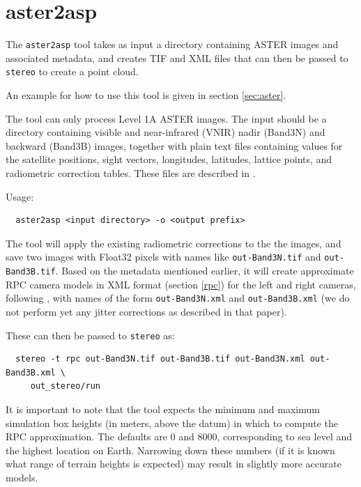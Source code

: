 \section{aster2asp}
\label{app:aster}

The \texttt{aster2asp} tool takes as input a directory containing ASTER images and associated 
metadata, and creates TIF and XML files that can then be passed to \texttt{stereo} to create
a point cloud. 

An example for how to use this tool is given in section \ref{sec:aster}.

The tool can only process Level 1A ASTER images. The input should be a
directory containing visible and near-infrared (VNIR) nadir (Band3N) and
backward (Band3B) images, together with plain text files containing
values for the satellite positions, sight vectors, longitudes,
latitudes, lattice points, and radiometric correction tables. These
files are described in \cite{abrams2002aster}.

Usage:
\begin{verbatim}
  aster2asp <input directory> -o <output prefix>
\end{verbatim}

The tool will apply the existing radiometric corrections to the the
images, and save two images with Float32 pixels with names like
\texttt{out-Band3N.tif} and \texttt{out-Band3B.tif}. Based on the
metadata mentioned earlier, it will create approximate RPC camera models
in XML format (section \ref{rpc}) for the left and right cameras,
following \cite{girod2015improvement}, with names of the form
\texttt{out-Band3N.xml} and \texttt{out-Band3B.xml} (we do not perform
yet any jitter corrections as described in that paper).

These can then be passed to \texttt{stereo} as:
\begin{verbatim}
  stereo -t rpc out-Band3N.tif out-Band3B.tif out-Band3N.xml out-Band3B.xml \ 
     out_stereo/run
\end{verbatim}

It is important to note that the tool expects the minimum and maximum
simulation box heights (in meters, above the datum) in which to compute
the RPC approximation. The defaults are 0 and 8000, corresponding to sea
level and the highest location on Earth. Narrowing down these numbers
(if it is known what range of terrain heights is expected) may result in
slightly more accurate models.

